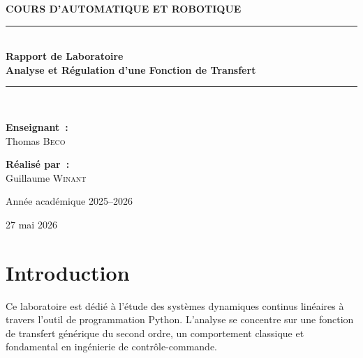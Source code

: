 \documentclass[11pt,a4paper]{article}
\begin{document}
\hypersetup{pageanchor=false}
\begin{titlepage}
  \thispagestyle{empty}
  \centering
  \vspace*{2cm}
  
  {\Large\bfseries\color{TealAccent}COURS D'AUTOMATIQUE ET ROBOTIQUE\par}
  \vspace{1.5cm}
  
  {\color{MarineBlue}\rule{\linewidth}{1.2mm}}\\[0.5cm]
  {\huge\bfseries\color{MarineBlue} Rapport de Laboratoire\\[0.3cm]
  \Large\color{DarkText} Analyse et Régulation d'une Fonction de Transfert}\\[0.4cm]
  {\color{MarineBlue}\rule{\linewidth}{0.5mm}}\\[2.5cm]
  
  \begin{minipage}{0.45\textwidth}
    \flushleft
    \textbf{\color{MarineBlue}Enseignant~:}\\[0.2cm]
    Thomas \textsc{Beco}
  \end{minipage}
  \hfill
  \begin{minipage}{0.45\textwidth}
    \flushright
    \textbf{\color{MarineBlue}Réalisé par~:}\\[0.2cm]
    Guillaume \textsc{Winant}
  \end{minipage}
  
  \vfill
  {\large\color{gray} Année académique 2025--2026 \par}
  \vspace{0.2cm}
  {\large 27 mai 2026}
\end{titlepage}
\hypersetup{pageanchor=true}

\tableofcontents
\newpage
{}

\section{Introduction}

Ce laboratoire est dédié à l'étude des systèmes dynamiques continus linéaires à travers l'outil de programmation Python. L'analyse se concentre sur une fonction de transfert générique du second ordre, un comportement classique et fondamental en ingénierie de contrôle-commande. 
\end{document}
